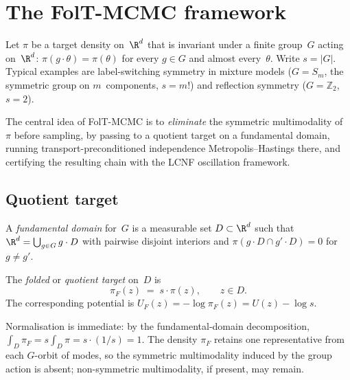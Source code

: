 %  

\section{The FolT-MCMC framework}
\label{sec:framework}

Let $\pi$ be a target density on~$\R^d$ that is invariant under a
finite group~$G$ acting on~$\R^d$: $\pi(g \cdot \theta) = \pi(\theta)$
for every $g \in G$ and almost every~$\theta$.  Write $s = |G|$.
Typical examples are label-switching symmetry in mixture models
($G = S_m$, the symmetric group on $m$~components, $s = m!$) and
reflection symmetry ($G = \mathbb{Z}_2$, $s = 2$).

The central idea of FolT-MCMC is to \emph{eliminate} the symmetric
multimodality of~$\pi$ before sampling, by passing to a quotient
target on a fundamental domain, running transport-preconditioned
independence Metropolis--Hastings there, and certifying the resulting
chain with the LCNF oscillation framework.


\subsection{Quotient target}
\label{sec:quotient_target}

A \emph{fundamental domain} for~$G$ is a measurable set
$D \subset \R^d$ such that $\R^d = \bigcup_{g \in G} g \cdot D$
with pairwise disjoint interiors and
$\pi(g \cdot D \cap g' \cdot D) = 0$ for $g \neq g'$.

\begin{definition}\label{def:quotient_target}
  The \emph{folded} or \emph{quotient target} on~$D$ is
  \begin{equation}\label{eq:pi_F}
    \pi_F(z) \;=\; s \cdot \pi(z), \qquad z \in D.
  \end{equation}
  The corresponding potential is
  $U_F(z) = -\log\pi_F(z) = U(z) - \log s$.
\end{definition}

\noindent
Normalisation is immediate: by the fundamental-domain decomposition,
$\int_D \pi_F = s \int_D \pi = s \cdot (1/s) = 1$.
The density $\pi_F$ retains one representative from each $G$-orbit
of modes, so the symmetric multimodality induced by the group action
is absent; non-symmetric multimodality, if present, may remain.

